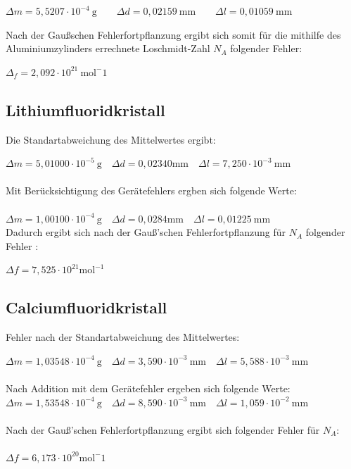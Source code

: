 \documentclass[12pt,a4paper,titlepage,headinclude,bibtotoc]{scrartcl}
\begin{document}
\vspace{3mm} 
$\Delta m =5,5207\cdot 10^{-4}\ \mathrm{g} \qquad\Delta d =0,02159\ \mathrm{mm}\qquad \Delta l = 0,01059\ \mathrm{mm}$
\vspace{3mm}
 
Nach der Gaußschen Fehlerfortpflanzung ergibt sich somit für die mithilfe des Aluminiumzylinders errechnete Loschmidt-Zahl $N_A$ folgender Fehler:\\

\vspace{3mm}

$\Delta_f = 2,092\cdot10^{21}\ \mathrm{mol^-1}$


\subsection{Lithiumfluoridkristall}

Die Standartabweichung des Mittelwertes ergibt:\\

\vspace{3mm}

$\Delta m = 5,01000\cdot10^{-5} \ \mathrm{g} \quad \Delta d= 0,02340  \mathrm{mm} \quad \Delta l = 7,250 \cdot 10^{-3}\ \mathrm{mm}$\\
\\
Mit Berücksichtigung des Gerätefehlers ergben sich folgende Werte:\\
\\
$\Delta m = 1,00100\cdot10^{-4} \ \mathrm{g} \quad \Delta d= 0,0284 \mathrm{mm} \quad \Delta l = 0,01225 \ \mathrm{mm}$\\

Dadurch ergibt sich nach der Gauß'schen Fehlerfortpflanzung für $N_A$ folgender Fehler :\\

\vspace{3mm}

$\Delta f= 7,525 \cdot 10^{21} \mathrm{mol^{-1}}$



\subsection{Calciumfluoridkristall}

Fehler nach der Standartabweichung des Mittelwertes: 
\vspace{3mm}

$\Delta m = 1,03548\cdot10^{-4} \ \mathrm{g} \quad \Delta d= 3,590 \cdot 10^{-3} \ \mathrm{mm} \quad \Delta l = 5,588 \cdot 10^{-3}\ \mathrm{mm}$\\
\\
Nach Addition mit dem Gerätefehler ergeben sich folgende Werte:
\\
$\Delta m = 1,53548\cdot10^{-4} \ \mathrm{g} \quad \Delta d= 8,590 \cdot 10^{-3} \ \mathrm{mm} \quad \Delta l = 1,059 \cdot 10^{-2}\ \mathrm{mm}$\\
\\
Nach der Gauß'schen Fehlerfortpflanzung ergibt sich folgender Fehler für $N_A$:\\
\\
$\Delta f =6,173 \cdot 10^{20} \mathrm{mol^-1}$
\end{document}

